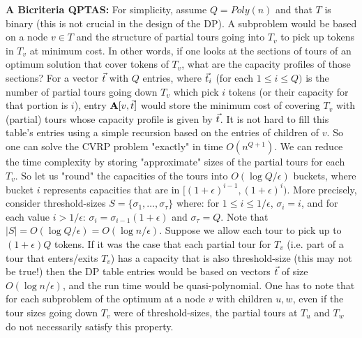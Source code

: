 \documentclass[twoside,leqno]{article}
\newcommand{\eps}{\epsilon}
\begin{document}
{\bf A Bicriteria QPTAS:} For simplicity, assume $Q=Poly(n)$ and that $T$ is binary (this is not crucial in the design of the DP).
A subproblem would be based on a node $v\in T$ and the structure of partial tours going into $T_v$ to pick up tokens in $T_v$
at minimum cost.
In other words, if one looks at the sections of tours of an optimum solution that cover tokens of $T_v$, what are the capacity profiles of those sections? For a vector $\vec{t}$ with $Q$ entries, where $\vec{t}_i$ (for each $1 \le i \le Q)$ is the number of partial tours going down $T_v$ which pick $i$ tokens (or their capacity for that portion is $i$), entry $\textbf{A}[v, \vec{t}]$ would store the minimum cost of covering $T_v$ with (partial) tours whose capacity profile is given by $\vec{t}$. It is not hard to fill this table's entries using a simple recursion based on the entries of children of $v$. So one can solve the CVRP problem "exactly" in time $O(n^{Q+1})$. We can reduce the time complexity by storing "approximate" sizes of the partial tours for each $T_v$.
So let us "round" the capacities of the tours into $O(\log Q/\epsilon)$  buckets, where bucket $i$ represents capacities that are in
$[(1+\eps)^{i-1},(1+\eps)^i)$. More precisely, consider threshold-sizes $S = \{\sigma_1, \ldots, \sigma_\tau \}$ where: for $1\leq i\leq 1/\epsilon$, $\sigma_i=i$, and for each value $i>1/\epsilon$: $\sigma_i = \sigma_{i-1}(1 + \eps)$ and $\sigma_\tau = Q$. Note
that $|S|=O(\log Q/\epsilon)=O(\log n/\eps)$. Suppose we allow each tour to pick up to $(1+\epsilon)Q$
tokens. If it was the case that each partial tour for $T_v$ (i.e. part of a tour that enters/exits $T_v$) has a capacity that is also threshold-size (this may not be true!) then the DP table entries
would be based on vectors $\vec{t}$ of size $O(\log n/\epsilon)$, and the run time would be quasi-polynomial. One has to note that
for each subproblem of the optimum at a node $v$ with children $u,w$, even if the tour sizes going down $T_v$
were of threshold-sizes, the partial tours at $T_u$ and $T_w$ do not necessarily satisfy this property.
\end{document}
